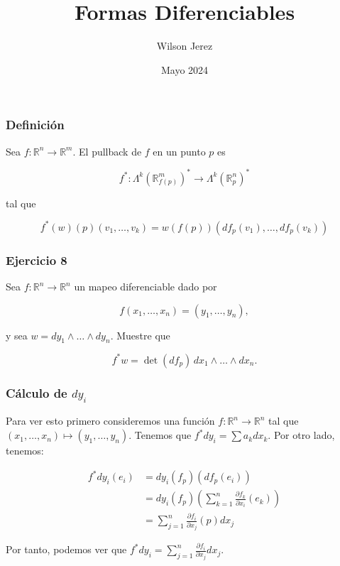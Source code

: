 \documentclass{beamer}
\title{Formas Diferenciables}
\author{Wilson Jerez}
\date{Mayo 2024}
\begin{document}
\frame{\titlepage}

\begin{frame}
\frametitle{Definición}

Sea \( f: \mathbb{R}^{n} \to \mathbb{R}^{m} \). El pullback de \( f \) en un punto \( p \) es 

\[ f^{*}:\varLambda^{k}(\mathbb{R}^{m}_{f(p)})^{*} \to \varLambda^{k}(\mathbb{R}^{n}_{p})^{*} \]

tal que 

\[ f^{*}(w)(p)(v_{1},\dots,v_{k}) = w(f(p))(df_{p}(v_{1}),\dots,df_{p}(v_{k})) \]


\end{frame}

\begin{frame}
\frametitle{Ejercicio 8}

Sea \( f:\mathbb{R}^{n} \to \mathbb{R}^{n} \) un mapeo diferenciable dado por 

\[ f(x_{1},\dots,x_{n}) = (y_{1},\dots,y_{n}), \]

y sea \( w = dy_{1} \wedge \dots \wedge dy_{n}. \) Muestre que 

\[ f^{*}w = \det(df_{p}) \, dx_{1} \wedge \dots \wedge dx_{n}. \]

\end{frame}

\begin{frame}
\frametitle{Cálculo de \( dy_i \)}

Para ver esto primero consideremos una función \( f: \mathbb{R}^n \to \mathbb{R}^n \) tal que \( (x_1,\dots,x_n) \mapsto (y_1,\dots,y_n) \).
Tenemos que \( f^* dy_i = \sum a_k dx_k \). Por otro lado, tenemos:

\begin{align*}
    f^* dy_i (e_i) &= dy_i(f_p)(df_p(e_i)) \\
    &= dy_i (f_p) \left(\sum_{k=1}^{n} \frac{\partial f_k}{\partial x_i} (e_k) \right) \\
    &= \sum_{j=1}^{n} \frac{\partial f_i}{\partial x_j}(p) dx_j
\end{align*}

Por tanto, podemos ver que \( f^* dy_i = \sum_{j=1}^{n} \frac{\partial f_i}{\partial x_j} dx_j \).

\end{frame}
\end{document}
